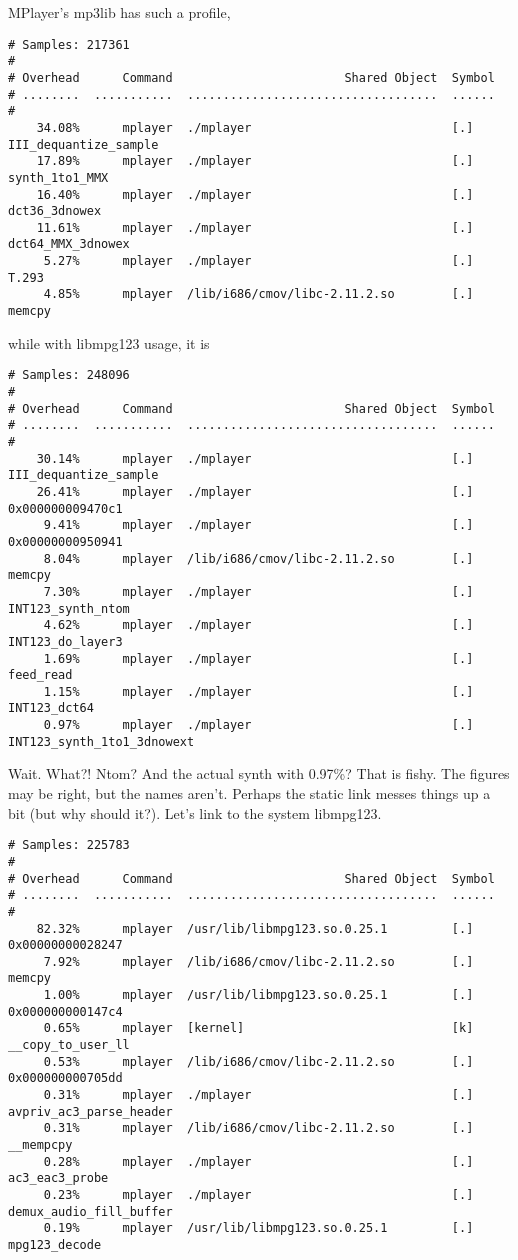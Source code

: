 \documentclass[a4paper,12pt]{scrartcl}
\begin{document}
MPlayer's mp3lib has such a profile,
\begin{verbatim}
# Samples: 217361
#
# Overhead      Command                        Shared Object  Symbol
# ........  ...........  ...................................  ......
#
    34.08%      mplayer  ./mplayer                            [.] III_dequantize_sample
    17.89%      mplayer  ./mplayer                            [.] synth_1to1_MMX
    16.40%      mplayer  ./mplayer                            [.] dct36_3dnowex
    11.61%      mplayer  ./mplayer                            [.] dct64_MMX_3dnowex
     5.27%      mplayer  ./mplayer                            [.] T.293
     4.85%      mplayer  /lib/i686/cmov/libc-2.11.2.so        [.] memcpy
\end{verbatim}
while with libmpg123 usage, it is
\begin{verbatim}
# Samples: 248096
#
# Overhead      Command                        Shared Object  Symbol
# ........  ...........  ...................................  ......
#
    30.14%      mplayer  ./mplayer                            [.] III_dequantize_sample
    26.41%      mplayer  ./mplayer                            [.] 0x000000009470c1
     9.41%      mplayer  ./mplayer                            [.] 0x00000000950941
     8.04%      mplayer  /lib/i686/cmov/libc-2.11.2.so        [.] memcpy
     7.30%      mplayer  ./mplayer                            [.] INT123_synth_ntom
     4.62%      mplayer  ./mplayer                            [.] INT123_do_layer3
     1.69%      mplayer  ./mplayer                            [.] feed_read
     1.15%      mplayer  ./mplayer                            [.] INT123_dct64
     0.97%      mplayer  ./mplayer                            [.] INT123_synth_1to1_3dnowext
\end{verbatim}
Wait. What?! Ntom? And the actual synth with 0.97\%? That is fishy.
The figures may be right, but the names aren't. Perhaps the static link messes things up a bit (but why should it?).
Let's link to the system libmpg123.
\begin{verbatim}
# Samples: 225783
#
# Overhead      Command                        Shared Object  Symbol
# ........  ...........  ...................................  ......
#
    82.32%      mplayer  /usr/lib/libmpg123.so.0.25.1         [.] 0x00000000028247
     7.92%      mplayer  /lib/i686/cmov/libc-2.11.2.so        [.] memcpy
     1.00%      mplayer  /usr/lib/libmpg123.so.0.25.1         [.] 0x000000000147c4
     0.65%      mplayer  [kernel]                             [k] __copy_to_user_ll
     0.53%      mplayer  /lib/i686/cmov/libc-2.11.2.so        [.] 0x000000000705dd
     0.31%      mplayer  ./mplayer                            [.] avpriv_ac3_parse_header
     0.31%      mplayer  /lib/i686/cmov/libc-2.11.2.so        [.] __mempcpy
     0.28%      mplayer  ./mplayer                            [.] ac3_eac3_probe
     0.23%      mplayer  ./mplayer                            [.] demux_audio_fill_buffer
     0.19%      mplayer  /usr/lib/libmpg123.so.0.25.1         [.] mpg123_decode
\end{verbatim}
\end{document}
